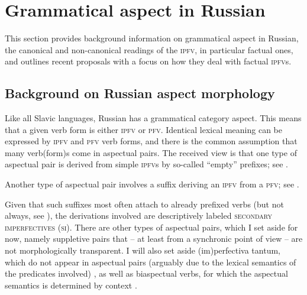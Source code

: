 \documentclass[output=paper]{langscibook}
\begin{document}
\section{Grammatical aspect in Russian}
\label{gehr:sec:aspect}

This section provides background information on grammatical aspect in Russian, the canonical and non-canonical readings of the \textsc{ipfv}, in particular factual ones, and outlines recent proposals with a focus on how they deal with factual \textsc{ipfv}s. 

\subsection{Background on Russian aspect morphology}
\label{gehr:sect:backgroundaspect}

Like all Slavic languages, Russian has a grammatical category aspect. This means that a given verb form is either \textsc{ipfv} or \textsc{pfv}. Identical lexical meaning can be expressed by \textsc{ipfv} and \textsc{pfv} verb forms, and there is the common assumption that many verb(form)s come in aspectual pairs. The received view is that one type of aspectual pair is derived from simple \textsc{ipfv}s by so-called ``empty'' prefixes; see .

\ea\label{gehr:ex:appref} 
\z	
\z

\noindent Another type of aspectual pair involves a suffix deriving an \textsc{ipfv} from a \textsc{pfv}; see .\pagebreak

\ea\label{gehr:ex:apsuf}
\label{gehr:ex:apsufa}			
\label{gehr:ex:apsufb}
\label{gehr:ex:apsufc} 
\z	
\z

\noindent Given that such suffixes most often attach to already prefixed verbs (but not always, see ), %
the derivations involved are descriptively labeled \textsc{secondary imperfectives} (\textsc{si}). There are other types of aspectual pairs, which I set aside for now, namely suppletive pairs that -- at least from a synchronic point of view -- are not morphologically transparent. I will also set aside (im)perfectiva tantum, which do not appear in aspectual pairs (arguably due to the lexical semantics of the predicates involved) \citep[see, e.g.,][]{isacenko62}, as well as biaspectual verbs, for which the aspectual semantics is determined by context \citep[see, e.g.,][]{janda07}.
\end{document}
